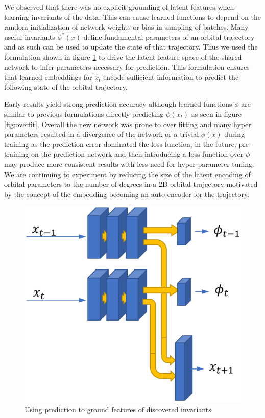 \documentclass[10pt,letterpaper]{report}
\author{Brandon Houghton}
\begin{document}
We observed that there was no explicit grounding of latent features when learning invariants of the data. This can cause learned functions to depend on the random initialization of network weights or bias in sampling of batches. Many useful invariants $\phi^*(x)$ define fundamental parameters of an orbital trajectory and as such can be used to update the state of that trajectory. Thus we used the formulation shown in figure \ref{fig:prednetwork} to drive the latent feature space of the shared network to infer parameters necessary for prediction. This formulation ensures that learned embeddings for $x_t$ encode sufficient information to predict the following state of the orbital trajectory.

Early results yield strong prediction accuracy although learned functions $\phi$ are similar to previous formulations directly predicting $\phi (x_t)$ as seen in figure \ref{fig:overfit}. Overall the new network was prone to over fitting and many hyper parameters resulted in a divergence of the network or a trivial $\phi(x)$ during training as the prediction error dominated the loss function, in the future, pre-training on the prediction network and then introducing a loss function over $\phi$ may produce more consistent results with less need for hyper-parameter tuning. We are continuing to experiment by reducing the size of the latent encoding of orbital parameters to the number of degrees in a 2D orbital trajectory motivated by the concept of the embedding becoming an auto-encoder for the trajectory.


\begin{figure}
	\centering
	\includegraphics[width=0.7\linewidth]{../images/predNetwork}
	\caption{Using prediction to ground features of discovered invariants}
	\label{fig:prednetwork}
\end{figure}
\end{document}
